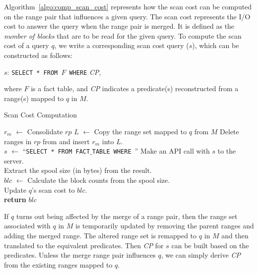 \documentclass[runningheads]{comsis2}
\begin{document}
Algorithm~\ref{algo:comp_scan_cost} represents how 
the scan cost can be computed on the range pair that \hbox{influences} a given query. 
The scan cost represents the I/O cost to answer the query when the range pair is merged. 
It is defined as the {\em number of blocks} that are to be read 
for the given query. To compute the scan cost of a query $q$, we write 
a corresponding scan cost query ($s$), which can be constructed as follows: 
\vspace{-.1in}
\begin{center}
$s$: {\tt SELECT * FROM $F$ WHERE} {\it CP},
\end{center} 
\vspace{-.1in}
where $F$ is a fact table, and 
{\it CP} indicates a predicate(s) reconstructed from 
a range(s) mapped to $q$ in $M$.

\begin{algorithm}[t]
\caption{Scan Cost Computation}
\label{algo:comp_scan_cost}
{
	$r_{m}$ $\leftarrow$ Consolidate $rp$ \;
	$L$ $\leftarrow$ Copy the range set mapped to $q$ from $M$\; 
	Delete ranges in $rp$ from and insert $r_{m}$ into $L$. \\
	$s$ $\leftarrow$ ``{\tt SELECT * FROM FACT$\_$TABLE WHERE }'' \;
	Make an API call with $s$ to the server. \\
	Extract the spool size (in bytes) from the result. \\
	$blc$ $\leftarrow$ Calculate the block counts from the spool size. \\
	Update $q$'s scan cost to $blc$. \\
	{\bf return} $blc$ \;
}
\end{algorithm}

If $q$ turns out being affected by the merge of a range pair, 
then the range set associated with $q$ in $M$ is temporarily updated 
by removing the parent ranges and adding the merged range. 
The altered range set is remapped to $q$ in $M$ and then 
translated to the equivalent predicates. Then {\it CP} for $s$ can be built based on the predicates.
Unless the merge range pair influences $q$, 
we can simply derive {\it CP} from the existing ranges mapped to $q$.
\end{document}
